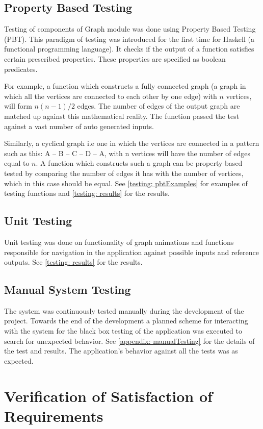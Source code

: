 \subsection{Property Based Testing}
Testing of components of Graph module was done using Property Based Testing (PBT).
This paradigm of testing was introduced for the first time for Haskell (a
functional programming language). It checks if the output of a function
satisfies certain prescribed properties. These properties are specified as
boolean predicates.

For example, a function which constructs a fully connected graph (a graph in
which all the vertices are connected to each other by one edge) with $n$
vertices, will form $n (n - 1) / 2$ edges. The number of edges of the output
graph are matched up against this mathematical reality. The function passed
the test against a vast number of auto generated inputs.

Similarly, a cyclical graph i.e one in which the vertices are connected in a
pattern such as this: A -- B -- C -- D -- A, with n vertices will have the
number of edges equal to $n$. A function which constructs such a graph can be
property based tested by comparing the number of edges it has with the number
of vertices, which in this case should be equal. See \autoref{testing: pbtExamples}
for examples of testing functions and \autoref{testing: results} for the results.

\subsection{Unit Testing}
Unit testing was done on functionality of graph animations and
functions responsible for navigation in the application against possible inputs
and reference outputs. See \autoref{testing: results} for the results.

\subsection{Manual System Testing}
The system was continuously tested manually during the development of the
project. Towards the end of the development a planned scheme for
interacting with the system for the black box testing of the application was
executed to search for unexpected behavior. See \autoref{appendix:
manualTesting} for the details of the test and results. The application's
behavior against all the tests was as expected.

\section{Verification of Satisfaction of Requirements}

